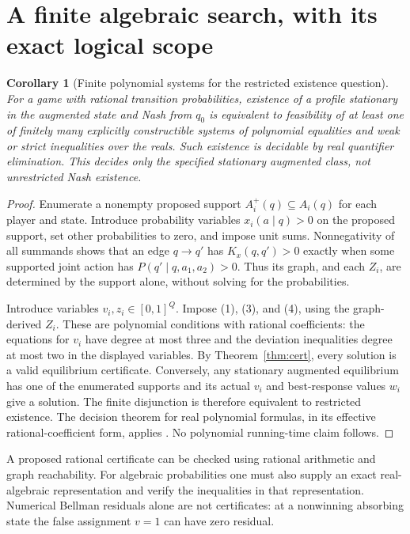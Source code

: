 \documentclass[11pt]{article}
\newtheorem{corollary}[theorem]{Corollary}
\theoremstyle{remark}\newtheorem{remark}[theorem]{Remark}
\begin{document}
\section*{A finite algebraic search, with its exact logical scope}
\begin{corollary}[Finite polynomial systems for the restricted existence question]\label{cor:finite}
For a game with rational transition probabilities, existence of a profile stationary in the augmented state and Nash from $q_0$ is equivalent to feasibility of at least one of finitely many explicitly constructible systems of polynomial equalities and weak or strict inequalities over the reals. Such existence is decidable by real quantifier elimination. This decides only the specified stationary augmented class, not unrestricted Nash existence.
\end{corollary}
\begin{proof}
Enumerate a nonempty proposed support $A_i^+(q)\subseteq A_i(q)$ for each player and state. Introduce probability variables $x_i(a\mid q)>0$ on the proposed support, set other probabilities to zero, and impose unit sums. Nonnegativity of all summands shows that an edge $q\to q'$ has $K_x(q,q')>0$ exactly when some supported joint action has $P(q'\mid q,a_1,a_2)>0$. Thus its graph, and each $Z_i$, are determined by the support alone, without solving for the probabilities.

Introduce variables $v_i,z_i\in[0,1]^Q$. Impose (1), (3), and (4), using the graph-derived $Z_i$. These are polynomial conditions with rational coefficients: the equations for $v_i$ have degree at most three and the deviation inequalities degree at most two in the displayed variables. By Theorem~\ref{thm:cert}, every solution is a valid equilibrium certificate. Conversely, any stationary augmented equilibrium has one of the enumerated supports and its actual $v_i$ and best-response values $w_i$ give a solution. The finite disjunction is therefore equivalent to restricted existence. The decision theorem for real polynomial formulas, in its effective rational-coefficient form, applies \cite{BPR}. No polynomial running-time claim follows.
\end{proof}

A proposed rational certificate can be checked using rational arithmetic and graph reachability. For algebraic probabilities one must also supply an exact real-algebraic representation and verify the inequalities in that representation. Numerical Bellman residuals alone are not certificates: at a nonwinning absorbing state the false assignment $v=1$ can have zero residual.
\end{document}
